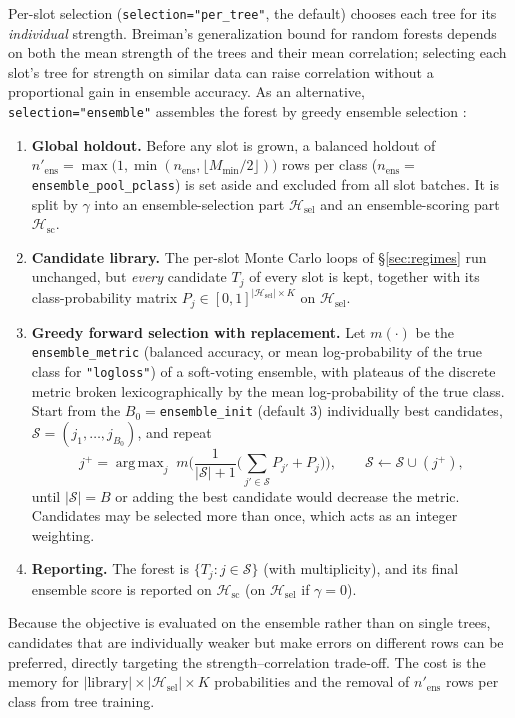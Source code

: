 \documentclass[11pt,a4paper]{article}
\newcommand{\code}[1]{\texttt{#1}}
\DeclareMathOperator*{\argmax}{arg\,max}
\begin{document}
Per-slot selection (\code{selection="per\_tree"}, the default) chooses each tree for its \emph{individual} strength. Breiman's generalization bound for random forests depends on both the mean strength of the trees and their mean correlation; selecting each slot's tree for strength on similar data can raise correlation without a proportional gain in ensemble accuracy. As an alternative, \code{selection="ensemble"} assembles the forest by greedy ensemble selection \citep{caruana2004}:
\begin{enumerate}[leftmargin=*, itemsep=3pt]
  \item \textbf{Global holdout.} Before any slot is grown, a balanced holdout of $n'_{\text{ens}} = \max\!\big(1, \min(n_{\text{ens}}, \lfloor M_{\min}/2 \rfloor)\big)$ rows per class ($n_{\text{ens}} = {}$\code{ensemble\_pool\_pclass}) is set aside and excluded from all slot batches. It is split by $\gamma$ into an ensemble-selection part $\mathcal{H}_{\text{sel}}$ and an ensemble-scoring part $\mathcal{H}_{\text{sc}}$.
  \item \textbf{Candidate library.} The per-slot Monte Carlo loops of \S\ref{sec:regimes} run unchanged, but \emph{every} candidate $T_j$ of every slot is kept, together with its class-probability matrix $P_j \in [0, 1]^{|\mathcal{H}_{\text{sel}}| \times K}$ on $\mathcal{H}_{\text{sel}}$.
  \item \textbf{Greedy forward selection with replacement.} Let $m(\cdot)$ be the \code{ensemble\_metric} (balanced accuracy, or mean log-probability of the true class for \code{"logloss"}) of a soft-voting ensemble, with plateaus of the discrete metric broken lexicographically by the mean log-probability of the true class. Start from the $B_0 = {}$\code{ensemble\_init} (default $3$) individually best candidates, $\mathcal{S} = (j_1, \dots, j_{B_0})$, and repeat
  \begin{equation}
    j^{+} = \argmax_{j} \; m\!\Big(\frac{1}{|\mathcal{S}| + 1}\Big(\sum_{j' \in \mathcal{S}} P_{j'} + P_j\Big)\Big),
    \qquad
    \mathcal{S} \gets \mathcal{S} \cup (j^{+}),
  \end{equation}
  until $|\mathcal{S}| = B$ or adding the best candidate would decrease the metric. Candidates may be selected more than once, which acts as an integer weighting.
  \item \textbf{Reporting.} The forest is $\{T_j : j \in \mathcal{S}\}$ (with multiplicity), and its final ensemble score is reported on $\mathcal{H}_{\text{sc}}$ (on $\mathcal{H}_{\text{sel}}$ if $\gamma = 0$).
\end{enumerate}
Because the objective is evaluated on the ensemble rather than on single trees, candidates that are individually weaker but make errors on different rows can be preferred, directly targeting the strength--correlation trade-off. The cost is the memory for $|\text{library}| \times |\mathcal{H}_{\text{sel}}| \times K$ probabilities and the removal of $n'_{\text{ens}}$ rows per class from tree training.
\end{document}
